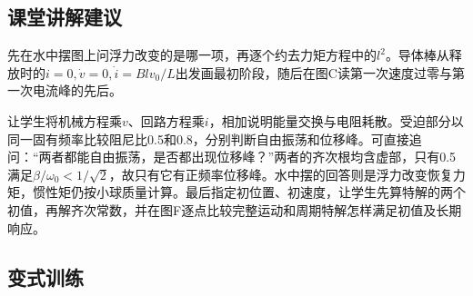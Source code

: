 \documentclass[UTF8,fontset=fandol,a4paper,11pt]{ctexart}
\begin{document}


\subsection*{课堂讲解建议}

先在水中摆图上问浮力改变的是哪一项，再逐个约去力矩方程中的$l^2$。导体棒从释放时的$i=0,\dot v=0,\dot i=Blv_0/L$出发画最初阶段，随后在图C读第一次速度过零与第一次电流峰的先后。

让学生将机械方程乘$v$、回路方程乘$i$，相加说明能量交换与电阻耗散。受迫部分以同一固有频率比较阻尼比0.5和0.8，分别判断自由振荡和位移峰。可直接追问：“两者都能自由振荡，是否都出现位移峰？”两者的齐次根均含虚部，只有0.5满足$\beta/\omega_0<1/\sqrt2$，故只有它有正频率位移峰。水中摆的回答则是浮力改变恢复力矩，惯性矩仍按小球质量计算。最后指定初位置、初速度，让学生先算特解的两个初值，再解齐次常数，并在图F逐点比较完整运动和周期特解怎样满足初值及长期响应。



\subsection*{变式训练}
\end{document}
